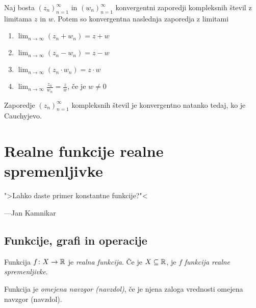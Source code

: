 \documentclass[12pt, a4paper]{article}
\begin{document}
\obvs

\begin{posledica}
Naj bosta $(z_n)_{n=1}^\infty$ in $(w_n)_{n=1}^\infty$ konvergentni zaporedji kompleksnih števil z limitama $z$ in $w$. Potem so konvergentna naslednja zaporedja z limitami

\begin{enumerate}[label=\roman*)]
\item $\displaystyle\lim_{n\to\infty}(z_n+w_n)=z+w$
\item $\displaystyle\lim_{n\to\infty}(z_n-w_n)=z-w$
\item $\displaystyle\lim_{n\to\infty}(z_n\cdot w_n)=z\cdot w$
\item $\displaystyle\lim_{n\to\infty}\frac{z_n}{w_n}=\frac{z}{w}$, če je $w\ne 0$
\end{enumerate}
\end{posledica}

\begin{izrek}
Zaporedje $(z_n)_{n=1}^\infty$ kompleksnih števil je konvergentno natanko tedaj, ko je Cauchyjevo.
\end{izrek}

\obvs

\newpage

\section{Realne funkcije realne spremenljivke}

\epigraph{">Lahko daste primer konstantne funkcije?"<}{---Jan Kamnikar}

\subsection{Funkcije, grafi in operacije}

\begin{okvir}
\begin{definicija}
Funkcija $f\colon X\to\mathbb{R}$ je \emph{realna funkcija}. Če je $X\subseteq\mathbb{R}$, je $f$ \emph{funkcija realne spremenljivke}.
\end{definicija}
\end{okvir}

\begin{definicija}
Funkcija je \emph{omejena navzgor (navzdol)}, če je njena zaloga vrednosti omejena navzgor (navzdol).
\end{definicija}
\end{document}
